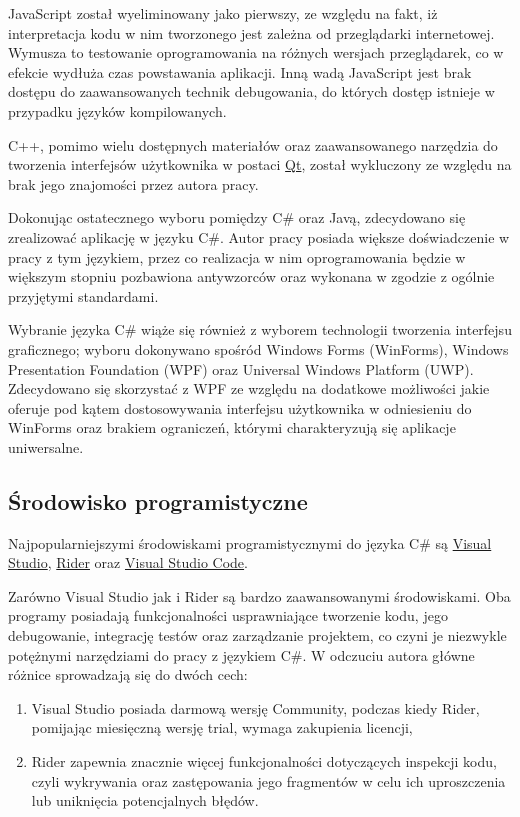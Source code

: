 \documentclass[skorowidz,skroty]{dyplomWEZUT}
\begin{document}
JavaScript został wyeliminowany jako pierwszy, ze względu na fakt, iż interpretacja kodu w nim tworzonego jest zależna od przeglądarki internetowej. Wymusza to testowanie oprogramowania na różnych wersjach przeglądarek, co w efekcie wydłuża czas powstawania aplikacji. Inną wadą JavaScript jest brak dostępu do zaawansowanych technik debugowania, do których dostęp istnieje w przypadku języków kompilowanych.

C++, pomimo wielu dostępnych materiałów oraz zaawansowanego narzędzia do tworzenia interfejsów użytkownika w postaci \href{www.qt.io}{Qt}, został wykluczony ze względu na brak jego znajomości przez autora pracy.

Dokonując ostatecznego wyboru pomiędzy C\# oraz Javą, zdecydowano się zrealizować aplikację w języku C\#. Autor pracy posiada większe doświadczenie w pracy z tym językiem, przez co realizacja  w nim oprogramowania będzie w większym stopniu pozbawiona antywzorców oraz wykonana w zgodzie z ogólnie przyjętymi standardami. 

Wybranie języka C\# wiąże się również z wyborem technologii tworzenia interfejsu graficznego; wyboru dokonywano spośród Windows Forms (WinForms), Windows Presentation Foundation (WPF) oraz Universal Windows Platform (UWP). Zdecydowano się skorzystać z WPF ze względu na dodatkowe możliwości jakie oferuje pod kątem dostosowywania interfejsu użytkownika w odniesieniu do WinForms oraz brakiem ograniczeń, którymi charakteryzują się aplikacje uniwersalne\cite{winformswpfuwp}. 


\subsection{Środowisko programistyczne}
Najpopularniejszymi środowiskami programistycznymi do języka C\# są \href{https://visualstudio.microsoft.com/vs/}{Visual Studio}, \href{https://www.jetbrains.com/rider/}{Rider} oraz \href{https://code.visualstudio.com}{Visual Studio Code}.

Zarówno Visual Studio jak i Rider są bardzo zaawansowanymi środowiskami. Oba programy posiadają funkcjonalności usprawniające tworzenie kodu, jego debugowanie, integrację testów oraz zarządzanie projektem, co czyni je niezwykle potężnymi narzędziami do pracy z językiem C\#. W odczuciu autora główne różnice sprowadzają się do dwóch cech:
\begin{enumerate}
    \item Visual Studio posiada darmową wersję Community, podczas kiedy Rider, pomijając miesięczną wersję trial, wymaga zakupienia licencji,
    \item Rider zapewnia znacznie więcej funkcjonalności dotyczących inspekcji kodu, czyli wykrywania oraz zastępowania jego fragmentów w celu ich uproszczenia lub uniknięcia potencjalnych błędów\cite{rider}. 
\end{enumerate}
\end{document}

